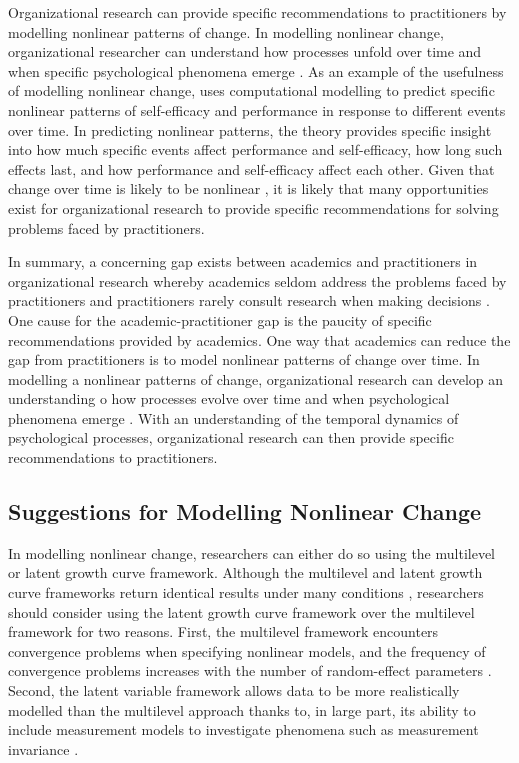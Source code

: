\documentclass[
12pt, %
twoside,
english]{guelphthesis}
\begin{document}
Organizational research can provide specific recommendations to practitioners by modelling nonlinear patterns of change. In modelling nonlinear change, organizational researcher can understand how processes unfold over time and when specific psychological phenomena emerge \autocite{mitchell2001,navarro2020}. As an example of the usefulness of modelling nonlinear change, \textcite{vancouver2020} uses computational modelling to predict specific nonlinear patterns of self-efficacy and performance in response to different events over time. In predicting nonlinear patterns, the theory provides specific insight into how much specific events affect performance and self-efficacy, how long such effects last, and how performance and self-efficacy affect each other. Given that change over time is likely to be nonlinear \autocite{cudeck2007}, it is likely that many opportunities exist for organizational research to provide specific recommendations for solving problems faced by practitioners.

In summary, a concerning gap exists between academics and practitioners in organizational research whereby academics seldom address the problems faced by practitioners \autocite[e.g.,][]{sackett1990} and practitioners rarely consult research when making decisions \autocite{rynes2002b}. One cause for the academic-practitioner gap is the paucity of specific recommendations provided by academics. One way that academics can reduce the gap from practitioners is to model nonlinear patterns of change over time. In modelling a nonlinear patterns of change, organizational research can develop an understanding o how processes evolve over time and when psychological phenomena emerge \autocite{mitchell2001,navarro2020}. With an understanding of the temporal dynamics of psychological processes, organizational research can then provide specific recommendations to practitioners.

\hypertarget{suggestions-for-modelling-nonlinear-change}{%
\subsection{Suggestions for Modelling Nonlinear Change}\label{suggestions-for-modelling-nonlinear-change}}

In modelling nonlinear change, researchers can either do so using the multilevel or latent growth curve framework. Although the multilevel and latent growth curve frameworks return identical results under many conditions \autocite[e.g.,][]{bauer2003}, researchers should consider using the latent growth curve framework over the multilevel framework for two reasons. First, the multilevel framework encounters convergence problems when specifying nonlinear models, and the frequency of convergence problems increases with the number of random-effect parameters \autocite[for a review, see][]{mcneish2020}. Second, the latent variable framework allows data to be more realistically modelled than the multilevel approach thanks to, in large part, its ability to include measurement models to investigate phenomena such as measurement invariance \autocite{sayer2001,hancock2001}.
\end{document}
